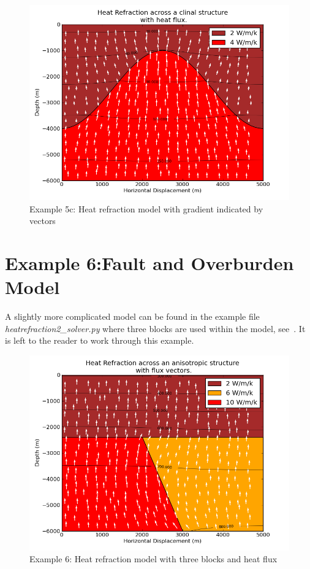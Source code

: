 \begin{figure}[ht]
\centerline{\includegraphics[width=5.in]{figures/heatrefractionflux}}
\caption{Example 5c: Heat refraction model with gradient indicated by vectors}
\label{fig:hr001qumodel}
\end{figure}
\clearpage

\section{Example 6:Fault and Overburden Model}
A slightly more complicated model can be found in the example file
\textit{heatrefraction2_solver.py} where three blocks are used within the
model, see~. It is left to the reader to work through
this example.

\begin{figure}[ht]
\centerline{\includegraphics[width=4.in]{figures/heatrefraction2flux}}
\caption{Example 6: Heat refraction model with three blocks and heat flux}
\label{fig:hr002qumodel}
\end{figure}
\clearpage
